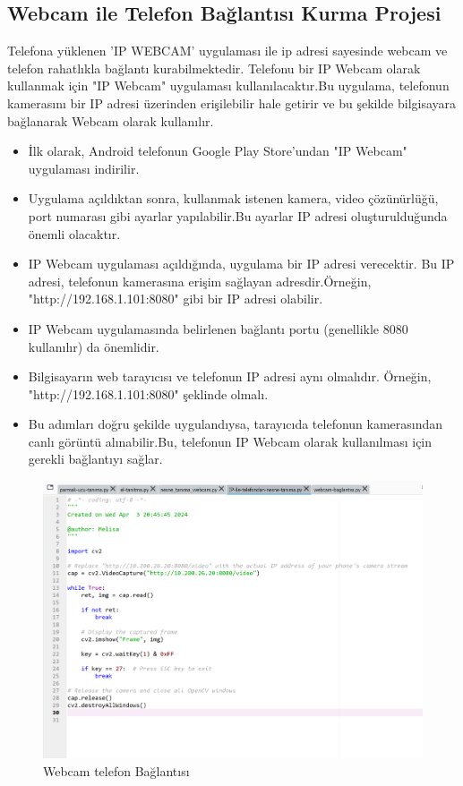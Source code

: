 \documentclass[11pt,a4paper]{report}
\begin{document}
	\subsection{Webcam ile Telefon Bağlantısı Kurma Projesi}
	Telefona yüklenen 'IP WEBCAM' uygulaması ile ip adresi sayesinde webcam ve telefon rahatlıkla bağlantı kurabilmektedir.
	Telefonu bir IP Webcam olarak kullanmak için "IP Webcam" uygulaması kullanılacaktır.Bu uygulama, telefonun kamerasını bir IP adresi üzerinden erişilebilir hale getirir ve bu şekilde bilgisayara bağlanarak Webcam olarak kullanılır.
	
	\begin{itemize}
		\item İlk olarak, Android telefonun Google Play Store'undan "IP Webcam" uygulaması indirilir.
		
		\item Uygulama açıldıktan sonra, kullanmak istenen kamera, video çözünürlüğü, port numarası gibi ayarlar yapılabilir.Bu ayarlar IP adresi oluşturulduğunda önemli olacaktır.
		
		
		\item IP Webcam uygulaması açıldığında, uygulama bir IP adresi verecektir. Bu IP adresi, telefonun kamerasına erişim sağlayan adresdir.Örneğin, "http://192.168.1.101:8080" gibi bir IP adresi olabilir.
		
		\item IP Webcam uygulamasında belirlenen bağlantı portu (genellikle 8080 kullanılır) da önemlidir.
		
		
		\item Bilgisayarın web tarayıcısı ve telefonun IP adresi aynı olmalıdır. Örneğin, "http://192.168.1.101:8080" şeklinde olmalı.
		
		\item Bu adımları doğru şekilde uygulandıysa, tarayıcıda telefonun kamerasından canlı görüntü alınabilir.Bu, telefonun IP Webcam olarak kullanılması için gerekli bağlantıyı sağlar.
	\end{itemize}
	
	\begin{figure}[!h]
		\centering
		\includegraphics[width=\textwidth]{webcam-telefon-baglama3}
		\caption{Webcam telefon Bağlantısı}
		\label{fig:ornek2}
	\end{figure}
	\newpage
	
\end{document}
